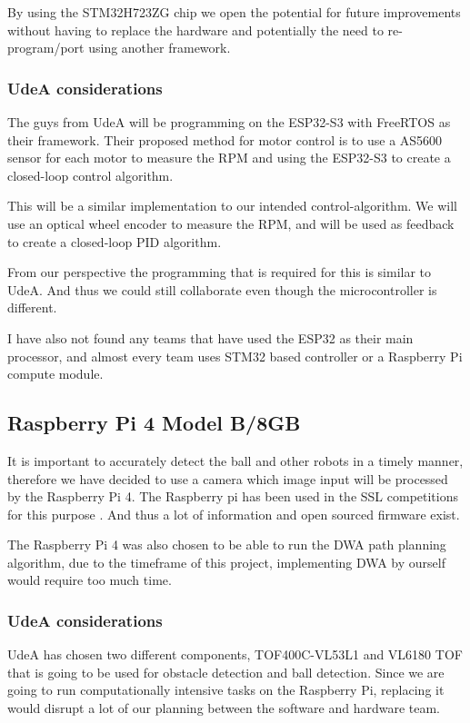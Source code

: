 \documentclass[a4paper,8pt]{article}
\begin{document}
  By using the STM32H723ZG chip we open the potential for future improvements without having to replace the hardware and potentially the need to re-program/port using another framework.

  \subsubsection{UdeA considerations}

  The guys from UdeA will be programming on the ESP32-S3 with FreeRTOS as their framework. Their proposed method for motor control is to use a AS5600 sensor for each motor to measure the RPM and using the ESP32-S3 to create a closed-loop control algorithm.
  
  This will be a similar implementation to our intended control-algorithm. We will use an optical wheel encoder to measure the RPM, and will be used as feedback to create a closed-loop PID algorithm.

  From our perspective the programming that is required for this is similar to UdeA. And thus we could still collaborate even though the microcontroller is different.

  I have also not found any teams that have used the ESP32 as their main processor, and almost every team uses STM32 based controller or a Raspberry Pi compute module.

  \subsection{Raspberry Pi 4 Model B/8GB}

  It is important to accurately detect the ball and other robots in a
  timely manner, therefore we have decided to use a camera which image
  input will be processed by the Raspberry Pi 4. The Raspberry pi has
  been used in the SSL competitions for this purpose
  \cite{ommerExtendedTeamDescription}\cite{satoGreenTea2024Team}. And thus a lot of information and open sourced firmware exist.

  The Raspberry Pi 4 was also chosen to be able to run the DWA path
  planning algorithm, due to the timeframe of this project, implementing
  DWA by ourself would require too much time.

  \subsubsection{UdeA considerations}

  UdeA has chosen two different components, TOF400C-VL53L1 and VL6180 TOF that is going to be used for obstacle detection and ball detection. Since we are going to run computationally intensive tasks on the Raspberry Pi, replacing it would disrupt a lot of our planning between the software and hardware team.
\end{document}
